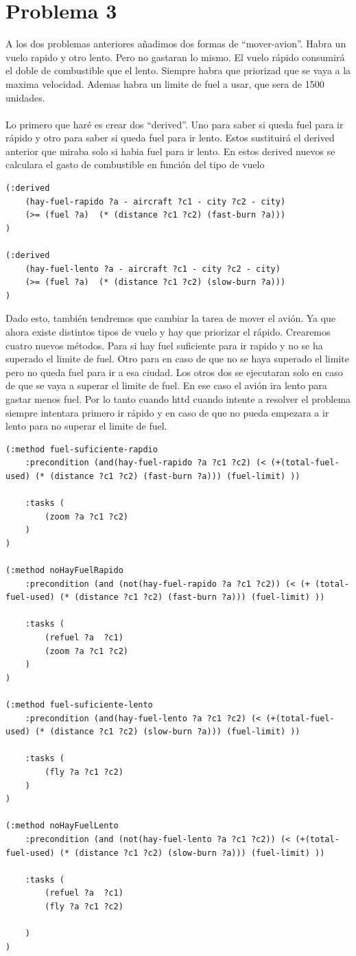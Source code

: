 \documentclass[12pt,a4paper]{article}
\begin{document}
\section{Problema 3}
A los dos problemas anteriores añadimos dos formas de ``mover-avion''. Habra un vuelo rapido y otro lento. Pero no gastaran lo mismo. El vuelo rápido consumirá el doble de combustible que el lento. Siempre habra que priorizad que se vaya a la maxima velocidad. Ademas habra un limite de fuel a usar, que sera de 1500 unidades. \\\\
Lo primero que haré es crear dos ``derived''. Uno para saber si queda fuel para ir rápido y otro para saber si queda fuel para ir lento. Estos sustituirá el derived anterior que miraba solo si habia fuel para ir lento. En estos derived nuevos se calculara el gasto de combustible en función del tipo de vuelo

\begin{lstlisting}
(:derived 
	(hay-fuel-rapido ?a - aircraft ?c1 - city ?c2 - city)
	(>= (fuel ?a)  (* (distance ?c1 ?c2) (fast-burn ?a)))
)
	
(:derived 
	(hay-fuel-lento ?a - aircraft ?c1 - city ?c2 - city)
	(>= (fuel ?a)  (* (distance ?c1 ?c2) (slow-burn ?a)))
)
\end{lstlisting}
Dado esto, también tendremos que cambiar la tarea de mover el avión. Ya que ahora existe distintos tipos de vuelo y hay que priorizar el rápido. Crearemos cuatro nuevos métodos. Para si hay fuel suficiente para ir rapido y no se ha superado el limite de fuel. Otro para  en caso de que no se haya superado el limite pero no queda fuel para ir a esa ciudad. Los otros dos se ejecutaran solo en caso de que se vaya a superar el limite de fuel. En ese caso el avión ira lento para gastar menos fuel.  Por lo tanto cuando httd  cuando intente a resolver el problema siempre intentara primero ir rápido y en caso de que no pueda empezara a ir lento para no superar el limite de fuel.  
\begin{lstlisting}
(:method fuel-suficiente-rapdio
	:precondition (and(hay-fuel-rapido ?a ?c1 ?c2) (< (+(total-fuel-used) (* (distance ?c1 ?c2) (fast-burn ?a))) (fuel-limit) ))
	
	:tasks (
		(zoom ?a ?c1 ?c2)
	)
)
	
(:method noHayFuelRapido
	:precondition (and (not(hay-fuel-rapido ?a ?c1 ?c2)) (< (+ (total-fuel-used) (* (distance ?c1 ?c2) (fast-burn ?a))) (fuel-limit) ))
	
	:tasks (
		(refuel ?a  ?c1)
		(zoom ?a ?c1 ?c2)
	)
)
	
(:method fuel-suficiente-lento
	:precondition (and(hay-fuel-lento ?a ?c1 ?c2) (< (+(total-fuel-used) (* (distance ?c1 ?c2) (slow-burn ?a))) (fuel-limit) ))
	
	:tasks (
		(fly ?a ?c1 ?c2)
	)
)

(:method noHayFuelLento
	:precondition (and (not(hay-fuel-lento ?a ?c1 ?c2)) (< (+(total-fuel-used) (* (distance ?c1 ?c2) (slow-burn ?a))) (fuel-limit) ))
	
	:tasks (
		(refuel ?a  ?c1)
		(fly ?a ?c1 ?c2)
	
	)
)
	
\end{lstlisting}
\end{document}
